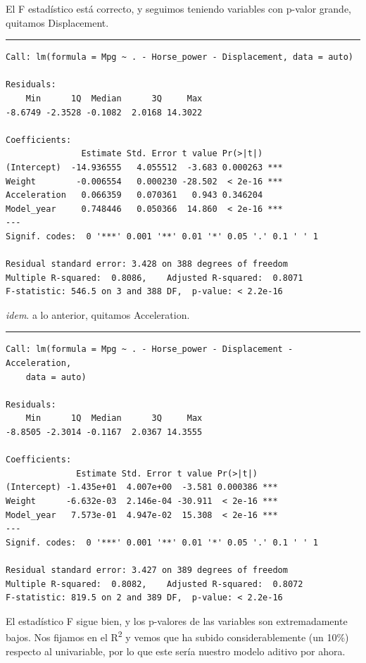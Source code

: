 El F estadístico está correcto, y seguimos teniendo variables con p-valor grande, quitamos Displacement.

\begin{center}\rule{\linewidth}{0.5pt}\end{center}

\begin{verbatim}
Call: lm(formula = Mpg ~ . - Horse_power - Displacement, data = auto)

Residuals:
    Min      1Q  Median      3Q     Max 
-8.6749 -2.3528 -0.1082  2.0168 14.3022 

Coefficients:
               Estimate Std. Error t value Pr(>|t|)    
(Intercept)  -14.936555   4.055512  -3.683 0.000263 ***
Weight        -0.006554   0.000230 -28.502  < 2e-16 ***
Acceleration   0.066359   0.070361   0.943 0.346204    
Model_year     0.748446   0.050366  14.860  < 2e-16 ***
---
Signif. codes:  0 '***' 0.001 '**' 0.01 '*' 0.05 '.' 0.1 ' ' 1

Residual standard error: 3.428 on 388 degrees of freedom
Multiple R-squared:  0.8086,    Adjusted R-squared:  0.8071 
F-statistic: 546.5 on 3 and 388 DF,  p-value: < 2.2e-16
\end{verbatim}

\textit{idem}. a lo anterior, quitamos Acceleration.

\begin{center}\rule{\linewidth}{0.5pt}\end{center}

\begin{verbatim}
Call: lm(formula = Mpg ~ . - Horse_power - Displacement - Acceleration, 
    data = auto)

Residuals:
    Min      1Q  Median      3Q     Max 
-8.8505 -2.3014 -0.1167  2.0367 14.3555 

Coefficients:
              Estimate Std. Error t value Pr(>|t|)    
(Intercept) -1.435e+01  4.007e+00  -3.581 0.000386 ***
Weight      -6.632e-03  2.146e-04 -30.911  < 2e-16 ***
Model_year   7.573e-01  4.947e-02  15.308  < 2e-16 ***
---
Signif. codes:  0 '***' 0.001 '**' 0.01 '*' 0.05 '.' 0.1 ' ' 1

Residual standard error: 3.427 on 389 degrees of freedom
Multiple R-squared:  0.8082,    Adjusted R-squared:  0.8072 
F-statistic: 819.5 on 2 and 389 DF,  p-value: < 2.2e-16
\end{verbatim}

El estadístico F sigue bien, y los p-valores de las variables son extremadamente bajos. Nos fijamos en el R\textsuperscript{2} y vemos que ha subido considerablemente (un 10\%) respecto al univariable, por lo que este sería nuestro modelo aditivo por ahora.


